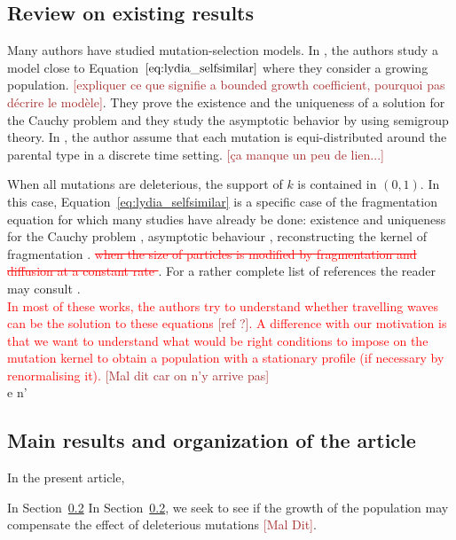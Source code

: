 \documentclass[11pt]{amsart}
\newcommand{\ndr}[1]{\textcolor{brown}{[#1]}}
\newcommand{\guim}[1]{\textcolor{red}{#1}}
\newcommand{\guimrem}[1]{\textcolor{red}{\sout{#1}}}
\begin{document}
\subsection{Review on existing results} \mbox{}

Many authors have studied mutation-selection models. 
In \cite{burger1996stationary}, the authors study a model close to Equation~$\eqref{eq:lydia_selfsimilar}$ where they consider a growing population. \ndr{expliquer ce que signifie a bounded growth coefficient, pourquoi pas décrire le modèle}. They prove the existence and the uniqueness of a solution for the Cauchy problem and they study the asymptotic behavior by using semigroup theory.
In \cite{eshel1972evolution}, the author assume that each mutation is equi-distributed around the parental type in a discrete time setting. \ndr{ça manque un peu de lien...}

When all mutations are deleterious, the support of $k$ is contained in $(0,1)$. In this case, Equation~\eqref{eq:lydia_selfsimilar} is a specific case of the fragmentation equation for which many studies have already be done: existence and uniqueness for the Cauchy problem \cite{melzak1957scalar}, asymptotic behaviour \cite{doumic2016time}, reconstructing the kernel of fragmentation \cite{hoang2017estimating,hoang2017nonparametric, doumic2018estimating,doumic2021inverse}. \guimrem{when the size of particles is modified by fragmentation and diffusion at a constant rate \cite{laurenccot2022fragmentation}}. 
For a rather complete list of references the reader may consult \cite{banasiak2019analytic}.\\

\guim{
In most of these works, the authors try to understand whether travelling waves can be the solution to these equations \ndr{ref ?}. A difference with our motivation is that we want to understand what would be right conditions to impose on the mutation kernel to obtain a population with a stationary profile (if necessary by renormalising it).} \ndr{Mal dit car on n'y arrive pas}\\
    e n'

\subsection{Main results and organization of the article} \mbox{}

In the present article, 

In Section~\ref{}
In Section~\ref{}, we seek to see if the growth of the population may compensate the effect of deleterious mutations \ndr{Mal Dit}. 
\end{document}
